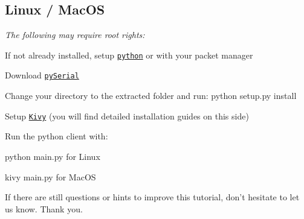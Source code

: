 \subsection*{Linux / Mac\+O\+S}

{\itshape The following may require root rights\+:}


\begin{DoxyEnumerate}
\item If not already installed, setup \href{https://www.python.org/download/}{\tt python} or with your packet manager
\item Download \href{https://pypi.python.org/pypi/pyserial}{\tt py\+Serial}
\item Change your directory to the extracted folder and run\+: {\ttfamily python setup.\+py install}
\item Setup \href{http://kivy.org/#download}{\tt Kivy} (you will find detailed installation guides on this side)
\item Run the python client with\+:
\begin{DoxyItemize}
\item {\ttfamily python main.\+py} for Linux
\item {\ttfamily kivy main.\+py} for Mac\+O\+S
\end{DoxyItemize}
\end{DoxyEnumerate}

If there are still questions or hints to improve this tutorial, don't hesitate to let us know. Thank you. 
